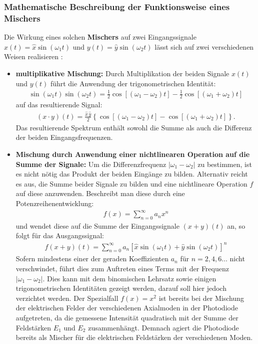 \documentclass[11pt, a4paper]{article}
\numberwithin{equation}{section}
\begin{document}
\subsubsection{Mathematische Beschreibung der Funktionsweise eines Mischers}
Die Wirkung eines solchen \textbf{Mischers} auf zwei Eingangssignale $x(t) = \hat{x} \sin(\omega_1 t)$ und $y(t) = \hat{y} \sin(\omega_2 t)$ lässt sich auf zwei verschiedenen Weisen realisieren \cite{horowitz_hill}:
\begin{itemize}
	\item \textbf{multiplikative Mischung:} Durch Multiplikation der beiden Signale $x(t)$ und $y(t)$ führt die Anwendung der trigonometrischen Identität:
	\begin{align}
		\sin(\omega_1 t) \sin(\omega_2 t) = \frac{1}{2} \cos\left[ (\omega_1 - \omega_2) t \right] - \frac{1}{2} \cos\left[ (\omega_1 + \omega_2) t\right]
	\end{align}
	auf das resultierende Signal:
	\begin{align}
		(x\cdot y)(t) = \frac{\hat{x} \, \hat{y}}{2} \left\{ \cos\left[ (\omega_1 - \omega_2) t \right] - \cos\left[ (\omega_1 + \omega_2) t\right]\right\} \text{.}
	\end{align}
	Das resultierende Spektrum enthält sowohl die Summe als auch die Differenz der beiden Eingangsfrequenzen.
	\item \textbf{Mischung durch Anwendung einer nichtlinearen Operation auf die Summe der Signale:} Um die Differenzfrequenz $|\omega_1 - \omega_2|$ zu bestimmen, ist es nicht nötig das Produkt der beiden Eingänge zu bilden.
	Alternativ reicht es aus, die Summe beider Signale zu bilden und eine nichtlineare Operation $f$ auf diese anzuwenden.
	Beschreibt man diese durch eine Potenzreihenentwicklung:
	\begin{align}
		f(x) = \sum_{n=0}^{\infty} a_n x^n
	\end{align}
	und wendet diese auf die Summe der Eingangssignale $(x+y)(t)$ an, so folgt für das Ausgangssignal:
	\begin{align}
		f(x+y)(t) = \sum_{n=0}^{\infty} a_n \left[ \hat{x} \sin(\omega_1 t) + \hat{y} \sin(\omega_2 t) \right]^n
	\end{align}
	Sofern mindestens einer der geraden Koeffizienten $a_n$ für $n = 2, 4, 6\dots$ nicht verschwindet, führt dies zum Auftreten eines Terms mit der Frequenz $|\omega_1 - \omega_2|$.
	Dies kann mit dem binomischen Lehrsatz sowie einigen trigonometrischen Identitäten gezeigt werden, darauf soll hier jedoch verzichtet werden.
	Der Spezialfall $f(x) = x^2$ ist bereits bei der Mischung der elektrischen Felder der verschiedenen Axialmoden in der Photodiode aufgetreten, da die gemessene Intensität quadratisch mit der Summe der Feldstärken $E_1$ und $E_2$ zusammenhängt.
	Demnach agiert die Photodiode bereits als Mischer für die elektrischen Feldstärken der verschiedenen Moden.
\end{itemize}
\end{document}
